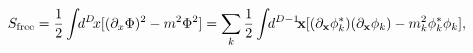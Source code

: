 \begin{equation}
 S_{\rm free}= \frac{1}{2}\int\!\! d^D\!x[(\partial_x\Phi)^2 - m^2\Phi^2]
 =\sum_k \frac{1}{2}\int\!\!d^{D-1}\!{\bf x}[(\partial_{\bf x}\phi_k^*)
 (\partial_{\bf x}\phi_k) - m_k^2\phi_k^*\phi_k],
\end{equation}

